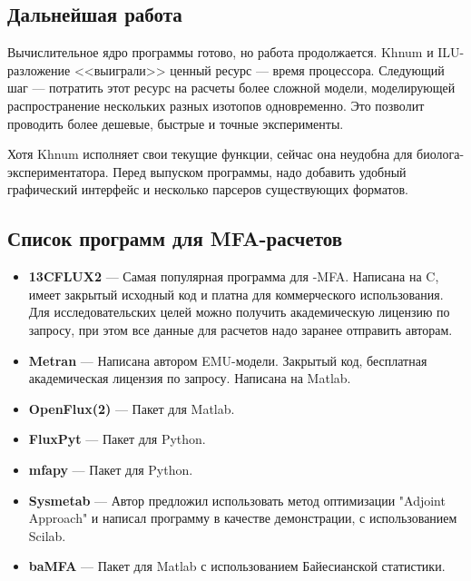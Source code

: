 \documentclass[14pt, a4paper]{extreport}
\newcommand{\CC}{C\nolinebreak\hspace{-.05em}\raisebox{.4ex}{\tiny\bf +}\nolinebreak\hspace{-.10em}\raisebox{.4ex}{\tiny\bf +}}
\def\CC{{C\nolinebreak[4]\hspace{-.05em}\raisebox{.4ex}{\tiny\bf ++}}} %
\begin{document}
\section{Дальнейшая работа}
Вычислительное ядро программы готово, но работа продолжается. Khnum и ILU-разложение <<выиграли>> ценный ресурс --- время процессора. Следующий шаг --- потратить этот ресурс на расчеты более сложной модели, моделирующей распространение нескольких разных изотопов одновременно. Это позволит проводить более дешевые, быстрые и точные эксперименты.

Хотя Khnum исполняет свои текущие функции, сейчас она неудобна для биолога-экспериментатора. Перед выпуском программы, надо добавить удобный графический интерфейс и несколько парсеров существующих форматов.


\begin{appendices}
	\chapter{Список программ для MFA-расчетов}
	\begin{itemize}
		\item \textbf{13CFLUX2} --- Самая популярная программа для -MFA. Написана на \CC{}, имеет закрытый исходный код и платна для коммерческого использования. Для исследовательских целей можно получить академическую лицензию по запросу\cite{13CFLUX2}, при этом все данные для расчетов надо заранее отправить авторам.
		
		\item \textbf{Metran} --- Написана автором EMU-модели. Закрытый код, бесплатная академическая лицензия по запросу. Написана на Matlab\cite{Metran}.
		
		\item \textbf{OpenFlux(2)} --- Пакет для Matlab\cite{OpenFlux, OpenFlux2}.
		
		\item \textbf{FluxPyt} --- Пакет для Python\cite{FluxPyt}.
		
		\item \textbf{mfapy} --- Пакет для Python.
		
		\item \textbf{Sysmetab} --- Автор предложил использовать метод оптимизации "Adjoint Approach"\cite{adjoint_approach} и написал программу в качестве демонстрации, с использованием Scilab.
		
		\item \textbf{baMFA} --- Пакет для Matlab с использованием Байесианской статистики\cite{bayesian_3}.
		

\end{itemize}
\end{appendices}
\end{document}
